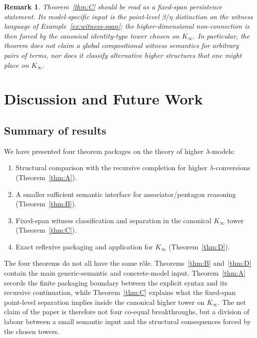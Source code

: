 \documentclass[webpdf,traditional,large,numbered]{oup-authoring-template}
\theoremstyle{thmstyleone}%
\theoremstyle{thmstyletwo}%
\newtheorem{remark}[theorem]{Remark}
\theoremstyle{thmstylethree}%
\newcommand{\Kinf}{K_\infty}
\begin{document}
\begin{remark}
  Theorem~\ref{thm:C} should be read as a fixed-span persistence statement.
  Its model-specific input is the point-level $\beta/\eta$ distinction on the
  witness language of Example~\ref{ex:witness-span}; the higher-dimensional
  non-connection is then forced by the canonical identity-type tower chosen on
  $\Kinf$.  In particular, the theorem does not claim a global compositional
  witness semantics for arbitrary pairs of terms, nor does it classify
  alternative higher structures that one might place on $\Kinf$.
\end{remark}

\section{Discussion and Future Work}\label{sec:discussion}

\subsection{Summary of results}

We have presented four theorem packages on the theory of higher
$\lambda$-models:
\begin{enumerate}[label=(\Alph*)]
  \item Structural comparison with the recursive completion for higher
    $\lambda$-conversions (Theorem~\ref{thm:A}).
  \item A smaller sufficient semantic interface for associator/pentagon reasoning
    (Theorem~\ref{thm:B}).
  \item Fixed-span witness classification and separation in the canonical
    $\Kinf$ tower
    (Theorem~\ref{thm:C}).
  \item Exact reflexive packaging and application for $\Kinf$
    (Theorem~\ref{thm:D}).
\end{enumerate}

\noindent
The four theorems do not all have the same rôle.  Theorems~\ref{thm:B}
and~\ref{thm:D} contain the main generic-semantic and concrete-model input.
Theorem~\ref{thm:A} records the finite packaging boundary between the explicit
syntax and its recursive continuation, while Theorem~\ref{thm:C} explains what
the fixed-span point-level separation implies inside the canonical higher tower
on $\Kinf$.  The net claim of the paper is therefore not four co-equal
breakthroughs, but a division of labour between a small semantic input and the
structural consequences forced by the chosen towers.
\end{document}
